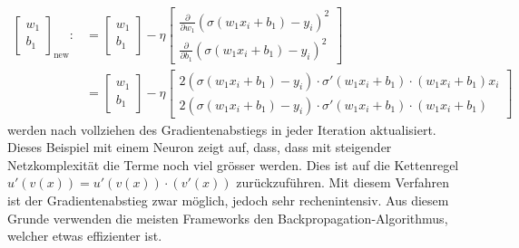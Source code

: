 \begin{equation}
\begin{split}
\begin{bmatrix}w_{1}\\b_{1}\end{bmatrix}_{\text{new}}:&={\begin{bmatrix}w_{1}\\b_{1}\end{bmatrix}}-\eta {\begin{bmatrix}
{\frac {\partial }{\partial w_{1}}}(\sigma(w_{1}x_{i}+b_{1})-y_{i})^{2}\\
{\frac {\partial }{\partial b_{1}}}(\sigma(w_{1}x_{i}+b_{1})-y_{i})^{2}\end{bmatrix}} \\ & =
{\begin{bmatrix}w_{1}\\b_{1}\end{bmatrix}}-\eta {\begin{bmatrix}2(\sigma(w_{1}x_{i}+b_{1}) - y_i) \cdot \sigma'(w_{1}x_{i}+b_{1}) \cdot (w_{1}x_{i}+b_{1}) x_{i} \\2(\sigma(w_{1}x_{i}+b_{1}) - y_i) \cdot \sigma'(w_{1}x_{i}+b_{1}) \cdot (w_{1}x_{i}+b_{1}) \end{bmatrix}}
\end{split}
\end{equation}
werden nach vollziehen des Gradientenabstiegs in jeder Iteration aktualisiert.
Dieses Beispiel mit einem Neuron zeigt auf, dass, dass mit steigender Netzkomplexität die Terme noch viel grösser werden. Dies ist auf die Kettenregel $u'(v(x)) = u'(v(x)) \cdot (v'(x))$ zurückzuführen. Mit diesem Verfahren ist der Gradientenabstieg zwar möglich, jedoch sehr rechenintensiv. Aus diesem Grunde verwenden die meisten Frameworks den Backpropagation-Algorithmus, welcher etwas effizienter ist.